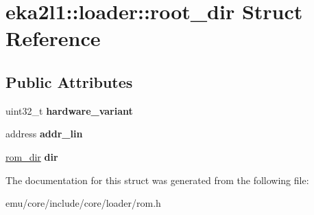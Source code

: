 \hypertarget{structeka2l1_1_1loader_1_1root__dir}{}\section{eka2l1\+:\+:loader\+:\+:root\+\_\+dir Struct Reference}
\label{structeka2l1_1_1loader_1_1root__dir}
\subsection*{Public Attributes}
\begin{DoxyCompactItemize}
\item 
\mbox{\label{structeka2l1_1_1loader_1_1root__dir_ae6bb315dd73922114e6ae6e1a3ae6c70}} 
uint32\+\_\+t {\bfseries hardware\+\_\+variant}
\item 
\mbox{\label{structeka2l1_1_1loader_1_1root__dir_a1653154a85174a3b515f8084888923d5}} 
address {\bfseries addr\+\_\+lin}
\item 
\mbox{\label{structeka2l1_1_1loader_1_1root__dir_a43c8472f456e67d5165ec4af0ea00e97}} 
\mbox{\hyperlink{structeka2l1_1_1loader_1_1rom__dir}{rom\+\_\+dir}} {\bfseries dir}
\end{DoxyCompactItemize}


The documentation for this struct was generated from the following file\+:\begin{DoxyCompactItemize}
\item 
emu/core/include/core/loader/rom.\+h\end{DoxyCompactItemize}
